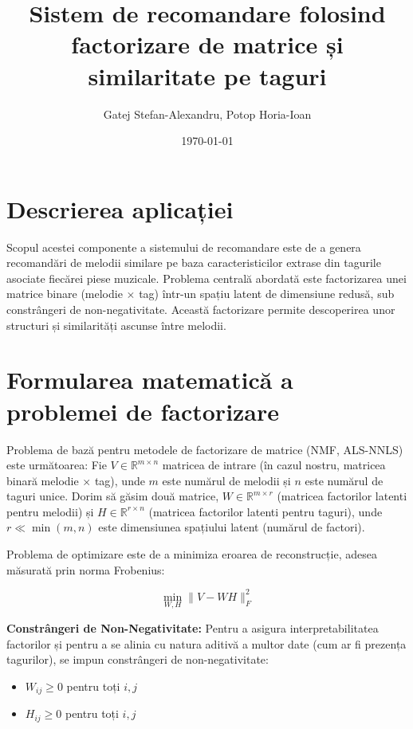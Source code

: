 \documentclass[12pt,a4paper]{article}
\title{Sistem de recomandare folosind factorizare de matrice și similaritate pe taguri}
\author{Gatej Stefan-Alexandru, Potop Horia-Ioan}
\date{\today}
\begin{document}
	
	\maketitle
	\tableofcontents
	\newpage
	
	\section{Descrierea aplicației}
	
	Scopul acestei componente a sistemului de recomandare este de a genera recomandări de melodii similare pe baza caracteristicilor extrase din tagurile asociate fiecărei piese muzicale. Problema centrală abordată este factorizarea unei matrice binare (melodie $\times$ tag) într-un spațiu latent de dimensiune redusă, sub constrângeri de non-negativitate. Această factorizare permite descoperirea unor structuri și similarități ascunse între melodii.
	
	\section{Formularea matematică a problemei de factorizare}
	
	Problema de bază pentru metodele de factorizare de matrice (NMF, ALS-NNLS) este următoarea:
	Fie $V \in \mathbb{R}^{m \times n}$ matricea de intrare (în cazul nostru, matricea binară melodie $\times$ tag), unde $m$ este numărul de melodii și $n$ este numărul de taguri unice. Dorim să găsim două matrice, $W \in \mathbb{R}^{m \times r}$ (matricea factorilor latenti pentru melodii) și $H \in \mathbb{R}^{r \times n}$ (matricea factorilor latenti pentru taguri), unde $r \ll \min(m,n)$ este dimensiunea spațiului latent (numărul de factori).
	
	Problema de optimizare este de a minimiza eroarea de reconstrucție, adesea măsurată prin norma Frobenius:
	
	\begin{equation}
		\min_{W, H} \| V - W H \|_F^2
		\label{eq:nmf_objective_main} %
	\end{equation}
	
	\textbf{Constrângeri de Non-Negativitate:}
	Pentru a asigura interpretabilitatea factorilor și pentru a se alinia cu natura aditivă a multor date (cum ar fi prezența tagurilor), se impun constrângeri de non-negativitate:
	\begin{itemize}
		\item $W_{ij} \geq 0$ pentru toți $i,j$
		\item $H_{ij} \geq 0$ pentru toți $i,j$
	\end{itemize}
	
\end{document}
